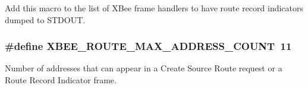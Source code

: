 Add this macro to the list of X\-Bee frame handlers to have route record indicators dumped to S\-T\-D\-O\-U\-T. 

\hypertarget{group__xbee__route_ga41b7c2f8ef5f6e4912572871790611d2}{
\subsubsection[{X\-B\-E\-E\-\_\-\-R\-O\-U\-T\-E\-\_\-\-M\-A\-X\-\_\-\-A\-D\-D\-R\-E\-S\-S\-\_\-\-C\-O\-U\-N\-T}]{\setlength{\rightskip}{0pt plus 5cm}\#define X\-B\-E\-E\-\_\-\-R\-O\-U\-T\-E\-\_\-\-M\-A\-X\-\_\-\-A\-D\-D\-R\-E\-S\-S\-\_\-\-C\-O\-U\-N\-T~11}}\label{group__xbee__route_ga41b7c2f8ef5f6e4912572871790611d2}


Number of addresses that can appear in a Create Source Route request or a Route Record Indicator frame. 



